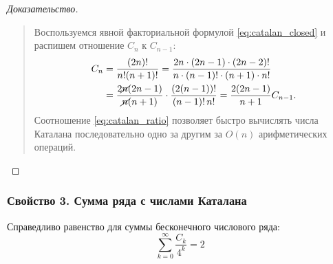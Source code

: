 \begin{proof}[Доказательство]~\\
    \begin{quote}
        Воспользуемся явной факториальной формулой \eqref{eq:catalan_closed} 
        и распишем отношение $C_n$ к $C_{n-1}$:
        \begin{align*}
            C_n &= \frac{(2n)!}{n!(n + 1)!} = 
            \frac{2n \cdot (2n - 1) \cdot (2n - 2)!}
            {n \cdot (n - 1)! \cdot (n + 1) \cdot n!} \\
            &= \frac{2 \cancel{n} (2n - 1)}{\cancel{n}(n + 1)} \cdot 
            \frac{(2(n - 1))!}{(n - 1)! \, n!} = 
            \frac{2(2n - 1)}{n + 1} C_{n-1}.
        \end{align*}
        Соотношение \eqref{eq:catalan_ratio} позволяет быстро вычислять 
        числа Каталана последовательно одно за другим за $O(n)$ 
        арифметических операций.
    \end{quote}
\end{proof}

\subsubsection{Свойство 3. Сумма ряда с числами Каталана}

\begin{proposition}
    Справедливо равенство для суммы бесконечного числового ряда:
    \begin{equation} \label{eq:catalan_series}
        \sum_{k=0}^{\infty} \frac{C_k}{4^k} = 2 \tag{6}
    \end{equation}
\end{proposition}

